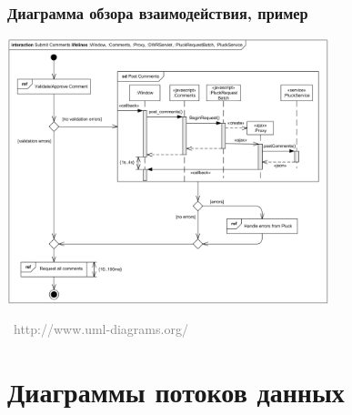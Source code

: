 \documentclass[xetex,mathserif,serif]{beamer}
\newcommand{\attribution}[1] {
    \vspace{-5mm}\begin{flushright}\begin{scriptsize}\textcolor{gray}{\textcopyright\, #1}\end{scriptsize}\end{flushright}
}
\begin{document}
    \begin{frame}
        \frametitle{Диаграмма обзора взаимодействия, пример}
        \begin{center}
            \includegraphics[width=0.7\textwidth]{interactionOverviewExample.png}
            \attribution{http://www.uml-diagrams.org/}
        \end{center}
    \end{frame}

    \section{Диаграммы потоков данных}
\end{document}
